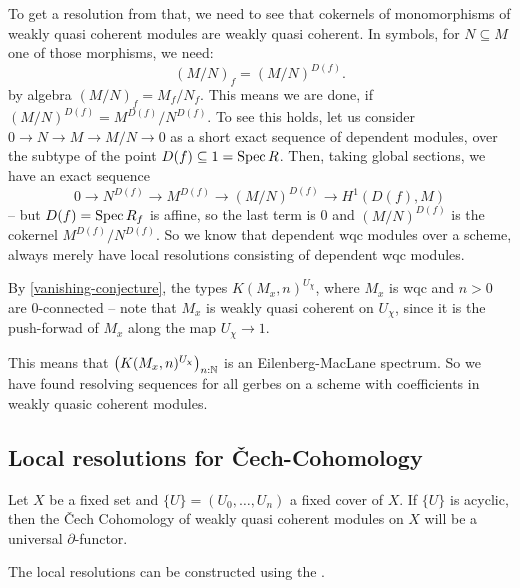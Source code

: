 To get a resolution from that, we need to see that cokernels of monomorphisms
of weakly quasi coherent modules are weakly quasi coherent.
In symbols, for $N\subseteq M$ one of those morphisms, we need:
\[
  (M/N)_f=(M/N)^{D(f)}.
\]
by algebra $(M/N)_f=M_f/N_f$.
This means we are done, if $(M/N)^{D(f)}=M^{D(f)}/{N^{D(f)}}$.
To see this holds, let us consider $0\to N\to M\to M/N\to 0$ as a short exact sequence of dependent modules,
over the subtype of the point $D(f)\subseteq 1=\operatorname{Spec} R$.
Then, taking global sections, we have an exact sequence
\[
 0\to N^{D(f)}\to M^{D(f)}\to (M/N)^{D(f)}\to H^1(D(f),M)
\]
-- but $D(f)=\operatorname{Spec} R_f$ is affine,
so the last term is 0 and $(M/N)^{D(f)}$ is the cokernel $M^{D(f)}/N^{D(f)}$.
So we know that dependent wqc modules over a scheme,
always merely have local resolutions consisting of dependent wqc modules.

By \cref{vanishing-conjecture},
the types $K(M_x,n)^{U_\chi}$, where $M_x$ is wqc and $n>0$ are $0$-connected
-- note that $M_x$ is weakly quasi coherent on $U_\chi$, since it is the push-forwad
of $M_x$ along the map $U_\chi\to 1$.

This means that $\left(K(M_x,n)^{U_\chi}\right)_{n:\mathbb{N}}$ is an Eilenberg-MacLane spectrum.
So we have found resolving sequences for all gerbes on a scheme with coefficients in weakly quasic coherent modules.


\subsection{Local resolutions for \v{C}ech-Cohomology}

Let $X$ be a fixed set and $\{U\}=(U_0,\dots,U_n)$ a fixed cover of $X$.
If $\{U\}$ is acyclic, then the \v{C}ech Cohomology of weakly quasi coherent modules on $X$
will be a universal $\partial$-functor.

The local resolutions can be constructed using the .